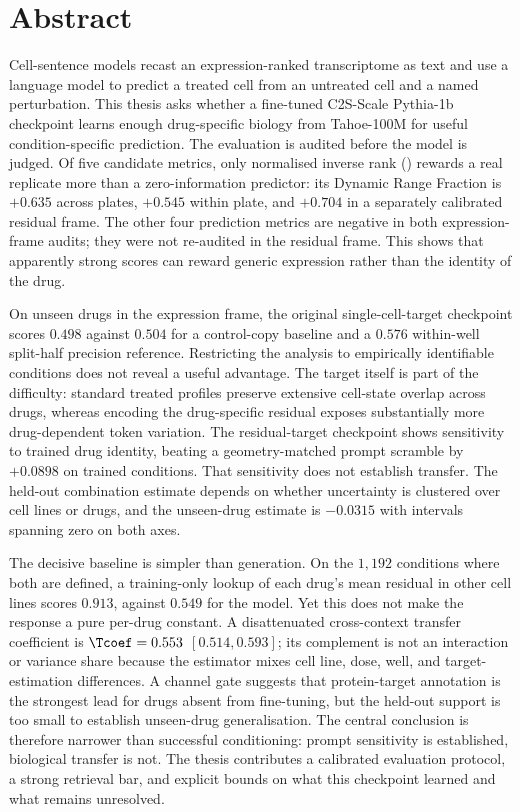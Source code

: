 \section*{Abstract}

Cell-sentence models recast an expression-ranked transcriptome as text and use a language model to
predict a treated cell from an untreated cell and a named perturbation. This thesis asks whether a
fine-tuned C2S-Scale Pythia-1b checkpoint learns enough drug-specific biology from Tahoe-100M for
useful condition-specific prediction. The evaluation is audited before the model is judged. Of five
candidate metrics, only normalised inverse rank (\NIR) rewards a real replicate more than a
zero-information predictor: its Dynamic Range Fraction is $+0.635$ across plates, $+0.545$ within
plate, and $+0.704$ in a separately calibrated residual frame. The other four prediction metrics are
negative in both expression-frame audits; they were not re-audited in the residual frame. This shows
that apparently strong scores can reward generic expression rather than the identity of the drug.

On unseen drugs in the expression frame, the original single-cell-target checkpoint scores $0.498$
against $0.504$ for a control-copy baseline and a $0.576$ within-well split-half precision reference.
Restricting the analysis to empirically identifiable conditions does not reveal a useful advantage.
The target itself is part of the difficulty: standard treated profiles preserve extensive
cell-state overlap across drugs, whereas encoding the drug-specific residual exposes substantially
more drug-dependent token variation. The residual-target checkpoint shows sensitivity to
trained drug identity, beating a geometry-matched prompt scramble by $+0.0898$ on trained
conditions. That sensitivity does not establish transfer. The held-out combination estimate depends
on whether uncertainty is clustered over cell lines or drugs, and the unseen-drug estimate is
$-0.0315$ with intervals spanning zero on both axes.

The decisive baseline is simpler than generation. On the $1{,}192$ conditions where both are
defined, a training-only lookup of each drug's mean residual in other cell lines scores $0.913$,
against $0.549$ for the model. Yet this does not make the response a pure per-drug constant. A
disattenuated cross-context transfer coefficient is $\Tcoef=0.553$
\nolinebreak[3]$[0.514,0.593]$; its complement is not an interaction or variance share because the
estimator mixes cell line, dose, well, and target-estimation differences. A channel gate suggests
that protein-target annotation is the strongest lead for drugs absent from fine-tuning, but the
held-out support is too small to establish unseen-drug generalisation. The central conclusion is
therefore narrower than successful conditioning: prompt sensitivity is established, biological
transfer is not. The thesis contributes a calibrated evaluation protocol, a strong retrieval bar,
and explicit bounds on what this checkpoint learned and what remains unresolved.
